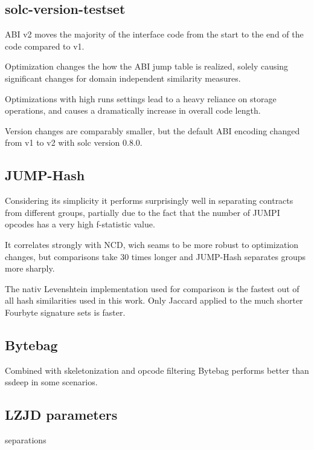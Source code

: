 \documentclass[../main.tex]{subfiles}
\begin{document}
\subsection{solc-version-testset}
ABI v2 moves the majority of the interface code from the start to the end of the code compared to v1.

Optimization changes the how the ABI jump table is realized, solely causing significant changes for domain independent similarity measures.

Optimizations with high runs settings lead to a heavy reliance on storage operations, and causes a dramatically increase in overall code length.

Version changes are comparably smaller, but the default ABI encoding changed from v1 to v2 with solc version 0.8.0.


\subsection{JUMP-Hash}
Considering its simplicity it performs surprisingly well in separating contracts from different groups, partially due to the fact that the number of JUMPI opcodes has a very high f-statistic value.

It correlates strongly with NCD, wich seams to be more robust to optimization changes, but comparisons take 30 times longer and JUMP-Hash separates groups more sharply.


The nativ Levenshtein implementation used for comparison is the fastest out of all hash similarities used in this work. Only Jaccard applied to the much shorter Fourbyte signature sets is faster.


\subsection{Bytebag}
Combined with skeletonization and opcode filtering Bytebag performs better than ssdeep in some scenarios.

\subsection{LZJD parameters}


\begin{table}[ht!]
  \centering

  \caption{separations}
  \label{tbl:lz_sep}
\end{table}
\end{document}

